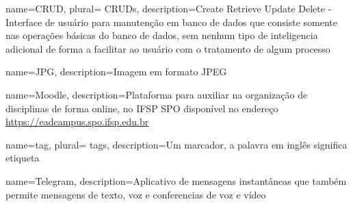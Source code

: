 
 



 {
    name=CRUD,
    plural= {CRUDs},
    description={Create Retrieve Update Delete - Interface de usuário para manutenção em banco de dados que consiste somente nas operações básicas do banco de dados, sem nenhum tipo de inteligencia adicional de forma a facilitar ao usuário com o tratamento de algum processo}
}

 {
    name=JPG,
    description={Imagem em formato JPEG}
}

 {
    name=Moodle,
    description={Plataforma para auxiliar na organização de disciplinas de forma online, no IFSP SPO disponível no endereço \url{https://eadcampus.spo.ifsp.edu.br}}
}


 {
    name=tag,
    plural= {tags},
    description={Um marcador, a palavra em inglês significa etiqueta}
}
                
 {
    name=Telegram,
    description={Aplicativo de mensagens instantâneas que também permite mensagens de texto, voz e conferencias de voz e vídeo}
}
